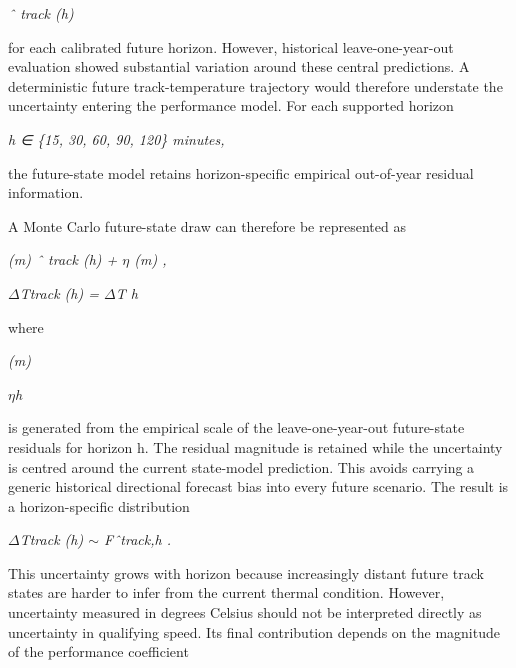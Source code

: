 \begin{center}\textit{ˆ track (h)}\end{center}

for each calibrated future horizon. However, historical leave-one-year-out evaluation showed substantial variation around these central predictions. A deterministic future track-temperature trajectory would therefore understate the uncertainty entering the performance model. For each supported horizon

\begin{center}\textit{h ∈ \{15, 30, 60, 90, 120\} minutes,}\end{center}

the future-state model retains horizon-specific empirical out-of-year residual information.

A Monte Carlo future-state draw can therefore be represented as

\begin{center}\textit{(m)         ˆ track (h) + \ensuremath{\eta} (m) ,}\end{center}

\begin{center}\textit{\ensuremath{\Delta}Ttrack (h) = \ensuremath{\Delta}T              h}\end{center}

where

\begin{center}\textit{(m)}\end{center}

\begin{center}\textit{\ensuremath{\eta}h}\end{center}

is generated from the empirical scale of the leave-one-year-out future-state residuals for horizon h. The residual magnitude is retained while the uncertainty is centred around the current state-model prediction. This avoids carrying a generic historical directional forecast bias into every future scenario. The result is a horizon-specific distribution

\begin{center}\textit{\ensuremath{\Delta}Ttrack (h) \ensuremath{\sim} Fˆtrack,h .}\end{center}

This uncertainty grows with horizon because increasingly distant future track states are harder to infer from the current thermal condition. However, uncertainty measured in degrees Celsius should not be interpreted directly as uncertainty in qualifying speed. Its final contribution depends on the magnitude of the performance coefficient

